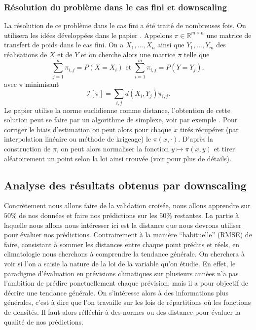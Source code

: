 \documentclass[a4paper,10pt]{article}
\begin{document}
	\subsubsection{Résolution du problème dans le cas fini et downscaling}
	La résolution de ce problème dans le cas fini a été traité de nombreuses fois. On utilisera les idées développées dans le papier \cite{robin2019multivariate}. Appelons $\pi \in \mathbb{R}^{m\times n}$ une matrice de transfert de poids dans le cas fini. On a $X_1,...,X_n$ ainsi que $Y_1,...,Y_m$ des réalisations de $X$ et de $Y$ et on cherche alors une matrice $\pi$ telle que 
	\[\sum_{j=1}^{n} \pi_{i,j}= P(X=X_i) \textrm{ et } \sum_{i=1}^{m} \pi_{i,j}= P(Y=Y_j),\]
	avec $\pi$ minimisant 
	\[\mathcal{I}[\pi]=\sum_{i,j}d(X_i,Y_j)\pi_{i,j}.\]  
	Le papier utilise la norme euclidienne comme distance, l'obtention de cette solution peut se faire par un algorithme de simplexe, voir par exemple \cite{huang2012optimal}. Pour corriger le biais d'estimation on peut alors pour chaque $x$ tirés récupérer (par interpolation linéaire ou méthode de krigeage) le $\pi(x,\cdot)$. D'après la construction de $\pi$, on peut alors normaliser la fonction $y\mapsto \pi(x,y)$ et tirer aléatoirement un point selon la loi ainsi trouvée (voir \cite{robin2019multivariate} pour plus de détails).
	
	
	\subsection{Analyse des résultats obtenus par downscaling}
	\label{analyse-pred}
	Concrètement nous allons faire de la validation croisée, nous allons apprendre sur $50\%$ de nos données et faire nos prédictions sur les $50\%$ restantes. La partie à laquelle nous allons nous intéresser ici est la distance que nous devrons utiliser pour évaluer nos prédictions. Contrairement à la manière ``habituelle'' (RMSE) de faire, consistant à sommer les distances entre chaque point prédits et réels, en climatologie nous cherchons à comprendre la tendance générale. On cherchera à voir si l'on a saisie la nature de la loi de la variable qu'on étudie. En effet, le paradigme d'évaluation en prévisions climatiques sur plusieurs années n'a pas l'ambition de prédire ponctuellement chaque prévision, mais il a pour objectif de décrire une tendance générale. On s'intéresse alors à des informations plus générales, c'est à dire que l'on travaille sur les lois de répartitions où les fonctions de densités. Il faut alors réfléchir à des normes ou des distance pour évaluer la qualité de nos prédictions.  
	
\end{document}
